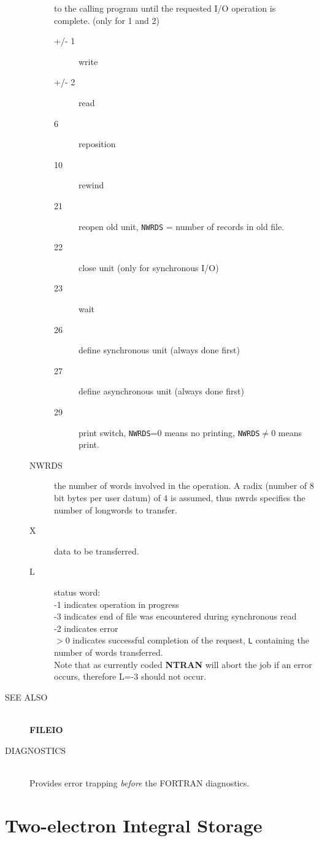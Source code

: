 \begin{description}
\begin{description}
to the calling program until the requested I/O
operation is complete. (only for 1 and 2)
\begin{description}
\item[+/- 1] write
\item[+/- 2] read
\item[6] reposition
\item[10] rewind
\item[21] reopen old unit, {\tt NWRDS} = number of records in old file.
\item[22] close unit (only for synchronous I/O)
\item[23] wait
\item[26] define synchronous  unit (always done first)
\item[27] define asynchronous unit (always done first)
\item[29] print switch, {\tt NWRDS}=0 means no printing, 
{\tt NWRDS}$\not=0$ means print.
\end{description}
\item[NWRDS] the number of words involved in the operation.
A radix (number of 8 bit bytes per user datum)
of 4 is assumed, thus nwrds specifies the number of
longwords to transfer.
\item[X] data to be transferred.
\item[L] status word: \\
-1 indicates operation in progress \\
-3 indicates end of file was encountered during 
synchronous read \\
-2 indicates error \\
$>0$ indicates successful completion of the request,
{\tt L} containing the number of words transferred. \\
Note that as currently coded {\bf NTRAN} will abort the job
if an error occurs, therefore L=-3 should not occur.
\end{description}
\item[SEE ALSO] \ \\
{\bf FILEIO}
\item[DIAGNOSTICS] \ \\
Provides error trapping {\em before} the FORTRAN diagnostics.
\end{description}
\newpage
\section{\sf Two-electron Integral Storage}
\label{stor2e}
